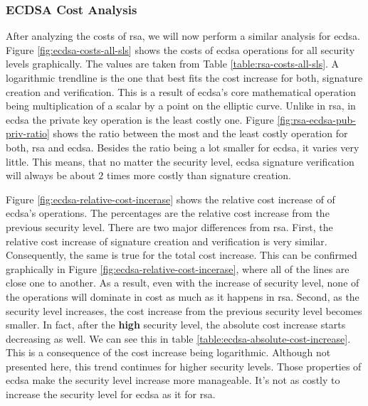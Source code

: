 \subsubsection{ECDSA Cost Analysis}

After analyzing the costs of \gls{rsa}, we will now perform a similar analysis for \gls{ecdsa}. Figure \ref{fig:ecdsa-costs-all-sls}
shows the costs of \gls{ecdsa} operations for all security levels graphically. The values are taken from Table \ref{table:rsa-costs-all-sls}. 
A logarithmic trendline is the one 
that best fits the cost increase for both, signature creation and verification. This is a result of \gls{ecdsa}'s core mathematical operation being
multiplication of a scalar by a point on the elliptic curve.
Unlike in \gls{rsa},
in \gls{ecdsa} the private key operation is the least costly one. Figure \ref{fig:rsa-ecdsa-pub-priv-ratio} shows the ratio between the most
and the least costly operation for both,
\gls{rsa} and \gls{ecdsa}. Besides the ratio being a lot smaller for \gls{ecdsa}, it varies very little. This means, that no matter
the security level, \gls{ecdsa} signature verification will always be about $2$ times more costly than signature creation.

Figure \ref{fig:ecdsa-relative-cost-incerase} shows the relative cost increase of of \gls{ecdsa}'s operations. The percentages
are the relative cost increase from the previous security level. There are two major differences from \gls{rsa}. First, the relative cost increase
of signature creation and verification is very similar. Consequently, the same is true for the total cost increase. This can be confirmed
graphically in Figure \ref{fig:ecdsa-relative-cost-incerase}, where all of the lines are
close one to another. As a result, even with the increase of security level, none of the operations will dominate in cost as much as it happens
in \gls{rsa}. Second, as the security level increases, the cost increase from the previous security level becomes smaller. In fact, after the
\textbf{high} security level, the absolute cost increase starts decreasing as well. We can see this in table \ref{table:ecdsa-absolute-cost-increase}.
This is a consequence of the cost increase being logarithmic. Although not presented here, this trend continues for higher security levels.
Those properties of \gls{ecdsa} make the security level increase more manageable. It's not as costly to increase the security level for
\gls{ecdsa} as it for \gls{rsa}.

